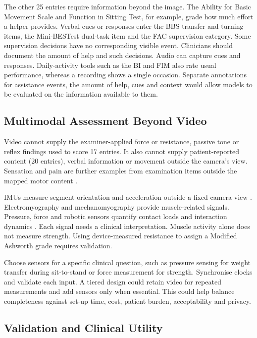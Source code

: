 \documentclass[11pt]{article}
\begin{document}
The other 25 entries require information beyond the image. The Ability for Basic Movement Scale and Function in Sitting Test, for example, grade how much effort a helper provides. Verbal cues or responses enter the BBS transfer and turning items, the Mini-BESTest dual-task item and the FAC supervision category. Some supervision decisions have no corresponding visible event. Clinicians should document the amount of help and such decisions. Audio can capture cues and responses. Daily-activity tools such as the BI and FIM also rate usual performance, whereas a recording shows a single occasion. Separate annotations for assistance events, the amount of help, cues and context would allow models to be evaluated on the information available to them.

\subsection{Multimodal Assessment Beyond Video}

Video cannot supply the examiner-applied force or resistance, passive tone or reflex findings used to score 17 entries. It also cannot supply patient-reported content (20 entries), verbal information or movement outside the camera's view. Sensation and pain are further examples from examination items outside the mapped motor content \cite{S3John202437682075,S3Stenum202438530801}.

IMUs measure segment orientation and acceleration outside a fixed camera view \cite{Yang2013SpatiotemporalGait,Held2018UpperLimbIMU}. Electromyography and mechanomyography provide muscle-related signals. Pressure, force and robotic sensors quantify contact loads and interaction dynamics \cite{Li2017IMUEMGMotorEvaluation,Formstone2021IMUMMG,Grimm2021KinematicValidation}. Each signal needs a clinical interpretation. Muscle activity alone does not measure strength. Using device-measured resistance to assign a Modified Ashworth grade requires validation.

Choose sensors for a specific clinical question, such as pressure sensing for weight transfer during sit-to-stand or force measurement for strength. Synchronise clocks and validate each input. A tiered design could retain video for repeated measurements and add sensors only when essential. This could help balance completeness against set-up time, cost, patient burden, acceptability and privacy.

\subsection{Validation and Clinical Utility}
\label{sec:validation}
\end{document}
